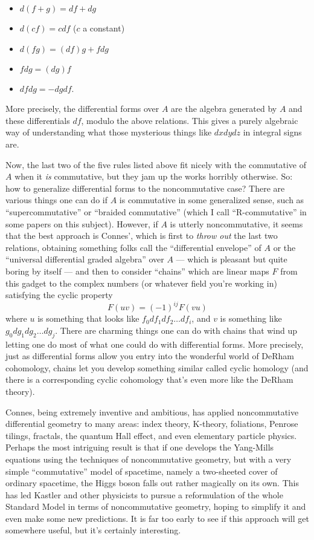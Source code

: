 \documentclass{article}
\def\tightlist{}
\begin{document}
\begin{itemize}
\tightlist
\item
  \(d(f+g) = df + dg\)
\item
  \(d(cf) = c df\) (\(c\) a constant)
\item
  \(d(fg) = (df)g + f dg\)
\item
  \(fdg = (dg)f\)
\item
  \(df dg = -dg df\).
\end{itemize}

More precisely, the differential forms over \(A\) are the algebra
generated by \(A\) and these differentials \(df\), modulo the above
relations. This gives a purely algebraic way of understanding what those
mysterious things like \(dx dy dz\) in integral signs are.

Now, the last two of the five rules listed above fit nicely with the
commutative of \(A\) when it \emph{is} commutative, but they jam up the
works horribly otherwise. So: how to generalize differential forms to
the noncommutative case? There are various things one can do if \(A\) is
commutative in some generalized sense, such as ``supercommutative'' or
``braided commutative'' (which I call ``R-commutative'' in some papers
on this subject). However, if \(A\) is utterly noncommutative, it seems
that the best approach is Connes', which is first to \emph{throw out}
the last two relations, obtaining something folks call the
``differential envelope'' of \(A\) or the ``universal differential
graded algebra'' over \(A\) --- which is pleasant but quite boring by
itself --- and then to consider ``chains'' which are linear maps \(F\)
from this gadget to the complex numbers (or whatever field you're
working in) satisfying the cyclic property \[F(uv) = (-1)^{ij} F(vu)\]
where \(u\) is something that looks like \(f_0 df_1 df_2 \ldots df_i\),
and \(v\) is something like \(g_0 dg_1 dg_2 \ldots dg_j\). There are
charming things one can do with chains that wind up letting one do most
of what one could do with differential forms. More precisely, just as
differential forms allow you entry into the wonderful world of DeRham
cohomology, chains let you develop something similar called cyclic
homology (and there is a corresponding cyclic cohomology that's even
more like the DeRham theory).

Connes, being extremely inventive and ambitious, has applied
noncommutative differential geometry to many areas: index theory,
K-theory, foliations, Penrose tilings, fractals, the quantum Hall
effect, and even elementary particle physics. Perhaps the most
intriguing result is that if one develops the Yang-Mills equations using
the techniques of noncommutative geometry, but with a very simple
``commutative'' model of spacetime, namely a two-sheeted cover of
ordinary spacetime, the Higgs boson falls out rather magically on its
own. This has led Kastler and other physicists to pursue a reformulation
of the whole Standard Model in terms of noncommutative geometry, hoping
to simplify it and even make some new predictions. It is far too early
to see if this approach will get somewhere useful, but it's certainly
interesting.
\end{document}
